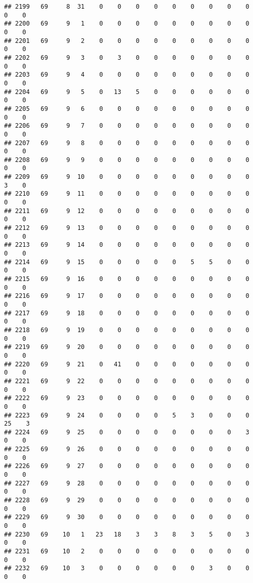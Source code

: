 \documentclass[]{article}
\begin{document}
\begin{verbatim}
## 2199   69     8  31    0    0    0    0    0    0    0    0    0    0    0
## 2200   69     9   1    0    0    0    0    0    0    0    0    0    0    0
## 2201   69     9   2    0    0    0    0    0    0    0    0    0    0    0
## 2202   69     9   3    0    3    0    0    0    0    0    0    0    0    0
## 2203   69     9   4    0    0    0    0    0    0    0    0    0    0    0
## 2204   69     9   5    0   13    5    0    0    0    0    0    0    0    0
## 2205   69     9   6    0    0    0    0    0    0    0    0    0    0    0
## 2206   69     9   7    0    0    0    0    0    0    0    0    0    0    0
## 2207   69     9   8    0    0    0    0    0    0    0    0    0    0    0
## 2208   69     9   9    0    0    0    0    0    0    0    0    0    0    0
## 2209   69     9  10    0    0    0    0    0    0    0    0    0    3    0
## 2210   69     9  11    0    0    0    0    0    0    0    0    0    0    0
## 2211   69     9  12    0    0    0    0    0    0    0    0    0    0    0
## 2212   69     9  13    0    0    0    0    0    0    0    0    0    0    0
## 2213   69     9  14    0    0    0    0    0    0    0    0    0    0    0
## 2214   69     9  15    0    0    0    0    0    5    5    0    0    0    0
## 2215   69     9  16    0    0    0    0    0    0    0    0    0    0    0
## 2216   69     9  17    0    0    0    0    0    0    0    0    0    0    0
## 2217   69     9  18    0    0    0    0    0    0    0    0    0    0    0
## 2218   69     9  19    0    0    0    0    0    0    0    0    0    0    0
## 2219   69     9  20    0    0    0    0    0    0    0    0    0    0    0
## 2220   69     9  21    0   41    0    0    0    0    0    0    0    0    0
## 2221   69     9  22    0    0    0    0    0    0    0    0    0    0    0
## 2222   69     9  23    0    0    0    0    0    0    0    0    0    0    0
## 2223   69     9  24    0    0    0    0    5    3    0    0    0   25    3
## 2224   69     9  25    0    0    0    0    0    0    0    0    3    0    0
## 2225   69     9  26    0    0    0    0    0    0    0    0    0    0    0
## 2226   69     9  27    0    0    0    0    0    0    0    0    0    0    0
## 2227   69     9  28    0    0    0    0    0    0    0    0    0    0    0
## 2228   69     9  29    0    0    0    0    0    0    0    0    0    0    0
## 2229   69     9  30    0    0    0    0    0    0    0    0    0    0    0
## 2230   69    10   1   23   18    3    3    8    3    5    0    3    0    0
## 2231   69    10   2    0    0    0    0    0    0    0    0    0    0    0
## 2232   69    10   3    0    0    0    0    0    0    3    0    0    0    0

\end{verbatim}
\end{document}
